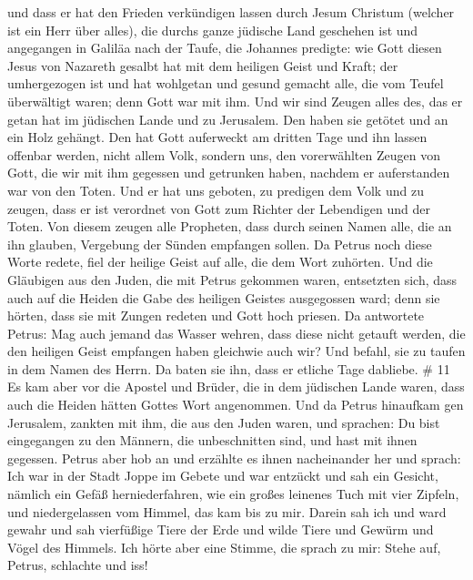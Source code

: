 und dass er hat den Frieden verkündigen lassen durch Jesum Christum
(welcher ist ein Herr über alles),  die durchs ganze
jüdische Land geschehen ist und angegangen in Galiläa nach der Taufe,
die Johannes predigte:  wie Gott diesen Jesus von Nazareth
gesalbt hat mit dem heiligen Geist und Kraft; der umhergezogen ist und
hat wohlgetan und gesund gemacht alle, die vom Teufel überwältigt waren;
denn Gott war mit ihm.  Und wir sind Zeugen alles des, das
er getan hat im jüdischen Lande und zu Jerusalem. Den haben sie getötet
und an ein Holz gehängt.  Den hat Gott auferweckt am
dritten Tage und ihn lassen offenbar werden,  nicht allem
Volk, sondern uns, den vorerwählten Zeugen von Gott, die wir mit ihm
gegessen und getrunken haben, nachdem er auferstanden war von den Toten.
 Und er hat uns geboten, zu predigen dem Volk und zu
zeugen, dass er ist verordnet von Gott zum Richter der Lebendigen und
der Toten.  Von diesem zeugen alle Propheten, dass durch
seinen Namen alle, die an ihn glauben, Vergebung der Sünden empfangen
sollen.  Da Petrus noch diese Worte redete, fiel der
heilige Geist auf alle, die dem Wort zuhörten.  Und die
Gläubigen aus den Juden, die mit Petrus gekommen waren, entsetzten sich,
dass auch auf die Heiden die Gabe des heiligen Geistes ausgegossen ward;
 denn sie hörten, dass sie mit Zungen redeten und Gott hoch
priesen. Da antwortete Petrus:  Mag auch jemand das Wasser
wehren, dass diese nicht getauft werden, die den heiligen Geist
empfangen haben gleichwie auch wir?  Und befahl, sie zu
taufen in dem Namen des Herrn. Da baten sie ihn, dass er etliche Tage
dabliebe. \# 11  Es kam aber vor die Apostel und Brüder, die
in dem jüdischen Lande waren, dass auch die Heiden hätten Gottes Wort
angenommen.  Und da Petrus hinaufkam gen Jerusalem, zankten
mit ihm, die aus den Juden waren,  und sprachen: Du bist
eingegangen zu den Männern, die unbeschnitten sind, und hast mit ihnen
gegessen.  Petrus aber hob an und erzählte es ihnen
nacheinander her und sprach:  Ich war in der Stadt Joppe im
Gebete und war entzückt und sah ein Gesicht, nämlich ein Gefäß
herniederfahren, wie ein großes leinenes Tuch mit vier Zipfeln, und
niedergelassen vom Himmel, das kam bis zu mir.  Darein sah
ich und ward gewahr und sah vierfüßige Tiere der Erde und wilde Tiere
und Gewürm und Vögel des Himmels.  Ich hörte aber eine
Stimme, die sprach zu mir: Stehe auf, Petrus, schlachte und iss!

